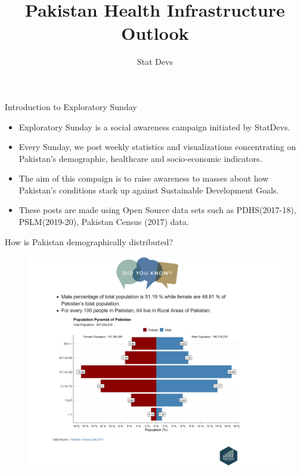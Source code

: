 \documentclass[
  ignorenonframetext,
]{beamer}
\title{Pakistan Health Infrastructure Outlook}
\author{Stat Devs}
\date{}
\begin{document}
\frame{\titlepage}
\ifdefined\Shaded\renewenvironment{Shaded}{\begin{tcolorbox}[breakable, frame hidden, enhanced, sharp corners, borderline west={3pt}{0pt}{shadecolor}, boxrule=0pt, interior hidden]}{\end{tcolorbox}}\fi

\begin{frame}{Introduction to Exploratory Sunday}
\protect\hypertarget{introduction-to-exploratory-sunday}{}
\begin{itemize}
\item
  Exploratory Sunday is a social awareness campaign initiated by
  StatDevs.
\item
  Every Sunday, we post weekly statistics and visualizations
  concentrating on Pakistan's demographic, healthcare and socio-economic
  indicators.
\item
  The aim of this compaign is to raise awareness to masses about how
  Pakistan's conditions stack up against Sustainable Development Goals.
\item
  These posts are made using Open Source data sets such as
  PDHS(2017-18), PSLM(2019-20), Pakistan Census (2017) data.
\end{itemize}
\end{frame}

\begin{frame}{How is Pakistan demographically distributed?}
\protect\hypertarget{how-is-pakistan-demographically-distributed}{}
\begin{figure}

{\centering \includegraphics{Demographics-Final.png}

}

\end{figure}
\end{frame}
\end{document}
